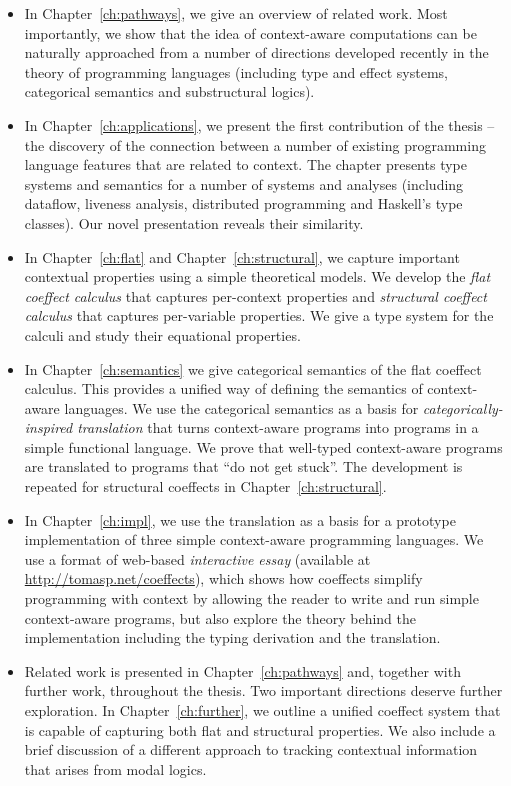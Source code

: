 \begin{itemize}
\item In Chapter~\ref{ch:pathways}, we give an overview of related work. Most importantly, we show
  that the idea of context-aware computations can be naturally approached from a number of
  directions developed recently in the theory of programming languages (including type and effect
  systems, categorical semantics and substructural logics).

\item In Chapter~\ref{ch:applications}, we present the first contribution of the thesis -- the discovery
  of the connection between a number of existing programming language features that are related
  to context. The chapter presents type systems and semantics for a number of systems and analyses
  (including dataflow, liveness analysis, distributed programming and Haskell's type classes).
  Our novel presentation reveals their similarity.

\item In Chapter~\ref{ch:flat} and Chapter~\ref{ch:structural}, we capture important contextual
  properties using a simple theoretical models. We develop the \emph{flat coeffect calculus} that
  captures per-context properties and \emph{structural coeffect calculus} that captures
  per-variable properties. We give a type system for the calculi and study their equational
  properties.

\item In Chapter~\ref{ch:semantics} we give categorical semantics of the flat coeffect calculus.
  This provides a unified way of defining the semantics of context-aware languages. We use the
  categorical semantics as a basis for \emph{categorically-inspired translation} that turns
  context-aware programs into programs in a simple functional language. We prove that well-typed
  context-aware programs are translated to programs that ``do not get stuck''. The development
  is repeated for structural coeffects in Chapter~\ref{ch:structural}.

\item In Chapter~\ref{ch:impl}, we use the translation as a basis for a prototype
  implementation of three simple context-aware programming languages. We use a format of web-based
  \emph{interactive essay} (available at \url{http://tomasp.net/coeffects}), which shows how 
  coeffects simplify programming with context by allowing the reader to write and run simple 
  context-aware programs, but also explore the theory behind the implementation including the 
  typing derivation and the translation.

\item Related work is presented in Chapter~\ref{ch:pathways} and, together with further work,
  throughout the thesis. Two important directions deserve further exploration. In Chapter~\ref{ch:further},
  we outline a unified coeffect system that is capable of capturing both flat and structural
  properties. We also include a brief discussion of a different approach to tracking contextual
  information that arises from modal logics.
\end{itemize}

